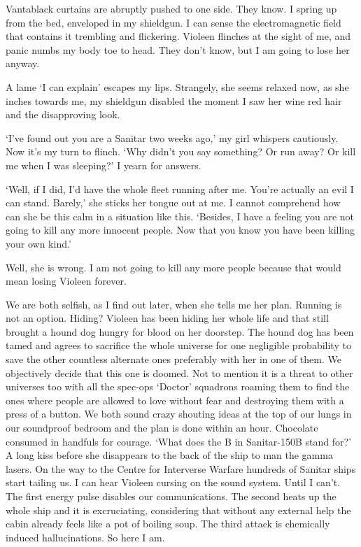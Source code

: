 \hsep

\begin{flashback}
Vantablack curtains are abruptly pushed to one side. They know. I
spring up from the bed, enveloped in my shieldgun. I can sense the
electromagnetic field that contains it trembling and
flickering. Violeen flinches at the sight of me, and panic numbs my
body toe to head. They don't know, but I am going to lose her anyway.

A lame `I can explain' escapes my lips. Strangely, she seems relaxed
now, as she inches towards me, my shieldgun disabled the moment I saw
her wine red hair and the disapproving look.

`I've found out you are a Sanitar two weeks ago,' my girl whispers
cautiously. Now it's my turn to flinch. `Why didn't you say something?
Or run away? Or kill me when I was sleeping?' I yearn for answers.

`Well, if I did, I'd have the whole fleet running after me. You're
actually an evil I can stand. Barely,' she sticks her tongue out at
me. I cannot comprehend how can she be this calm in a situation like
this. `Besides, I have a feeling you are not going to kill any more
innocent people. Now that you know you have been killing your own
kind.'

Well, she is wrong. I am not going to kill any more people because
that would mean losing Violeen forever.

We are both selfish, as I find out later, when she tells me her
plan. Running is not an option. Hiding? Violeen has been hiding her
whole life and that still brought a hound dog hungry for blood on her
doorstep. The hound dog has been tamed and agrees to sacrifice the
whole universe for one negligible probability to save the other
countless alternate ones preferably with her in one of them. We
objectively decide that this one is doomed. Not to mention it is a
threat to other universes too with all the spec-ops `Doctor' squadrons
roaming them to find the ones where people are allowed to love without
fear and destroying them with a press of a button.  We both sound
crazy shouting ideas at the top of our lungs in our soundproof bedroom
and the plan is done within an hour. Chocolate consumed in handfuls
for courage. `What does the B in Sanitar-150B stand for?'  A long kiss
before she disappears to the back of the ship to man the gamma
lasers. On the way to the Centre for Interverse Warfare hundreds of
Sanitar ships start tailing us. I can hear Violeen cursing on the
sound system. Until I can't. The first energy pulse disables our
communications. The second heats up the whole ship and it is
excruciating, considering that without any external help the cabin
already feels like a pot of boiling soup. The third attack is
chemically induced hallucinations. So here I am.
\end{flashback}

